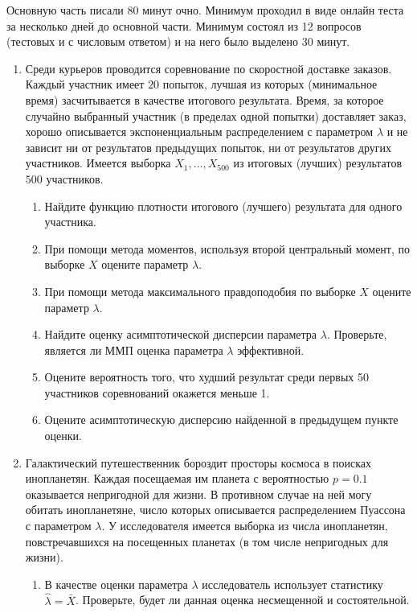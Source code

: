 Основную часть писали 80 минут очно. Минимум проходил в виде онлайн теста за несколько дней до основной части. 
Минимум состоял из 12 вопросов (тестовых и с числовым ответом) и на него было выделено 30 минут.


\begin{enumerate}
\item Среди курьеров проводится соревнование по скоростной доставке заказов. 
Каждый участник имеет $20$ попыток, 
лучшая из которых (минимальное время) засчитывается в качестве итогового результата. 
Время, за которое случайно выбранный участник (в пределах одной попытки) доставляет заказ, 
хорошо описывается экспоненциальным распределением с параметром $\lambda$ и не зависит ни от результатов предыдущих попыток, 
ни от результатов других участников. 
Имеется выборка $X_{1},\dots, X_{500}$  из итоговых (лучших) результатов $500$ участников.

\begin{enumerate}
\item Найдите функцию плотности итогового (лучшего) результата для одного участника.
\item При помощи метода моментов, используя второй центральный момент, по выборке $X$  оцените параметр $\lambda$.
\item При помощи метода максимального правдоподобия по выборке $X$  оцените параметр $\lambda$.
\item Найдите оценку асимптотической дисперсии параметра $\lambda$. Проверьте, является ли ММП оценка параметра $\lambda$ эффективной.
\item Оцените вероятность того, что худший результат среди первых 50 участников соревнований окажется меньше 1.
\item Оцените асимптотическую дисперсию найденной в предыдущем пункте оценки.
\end{enumerate}

\item Галактический путешественник бороздит просторы космоса в поисках инопланетян. 
Каждая посещаемая им планета с вероятностью $p=0.1$ оказывается непригодной для жизни. 
В противном случае на ней могу обитать инопланетяне, число которых описывается распределением Пуассона с параметром $\lambda$. 
У исследователя имеется выборка из числа инопланетян, повстречавшихся на посещенных планетах (в том числе непригодных для жизни).

\begin{enumerate}
\item В качестве оценки параметра $\lambda$ исследователь использует статистику $\hat{\lambda} = \bar{X}$. 
Проверьте, будет ли данная оценка несмещенной и состоятельной.


\end{enumerate}
\end{enumerate}
